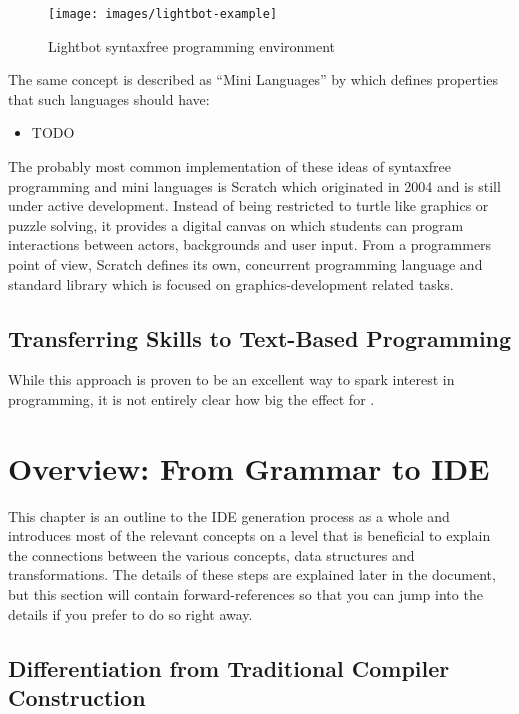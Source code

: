 \begin{figure}
  \texttt{[image: images/lightbot-example]}
  \caption{Lightbot syntaxfree programming environment}
  \label{fig:lightbot}
\end{figure}

The same concept is described as \enquote{Mini Languages} by \cite{brusilovsky_mini-languages_1997} which defines properties that such languages should have:

\begin{itemize}
\item TODO
\end{itemize}

The probably most common implementation of these ideas of syntaxfree programming and mini languages is Scratch which originated in 2004 \cite{maloney_scratch_2004} and is still under active development. Instead of being restricted to turtle like graphics or puzzle solving, it provides a digital canvas on which students can program interactions between actors, backgrounds and user input. From a programmers point of view, Scratch defines its own, concurrent programming language and standard library which is focused on graphics-development related tasks.

\subsection{Transferring Skills to Text-Based Programming}

While this approach is proven to be an excellent way to spark interest in programming, it is not entirely clear how big the effect for .

\section{Overview: From Grammar to IDE}

This chapter is an outline to the IDE generation process as a whole and introduces most of the relevant concepts on a level that is beneficial to explain the connections between the various concepts, data structures and transformations. The details of these steps are explained later in the document, but this section will contain forward-references so that you can jump into the details if you prefer to do so right away.

\subsection{Differentiation from Traditional Compiler Construction}
\label{sec:diff-traditional-compiler}

